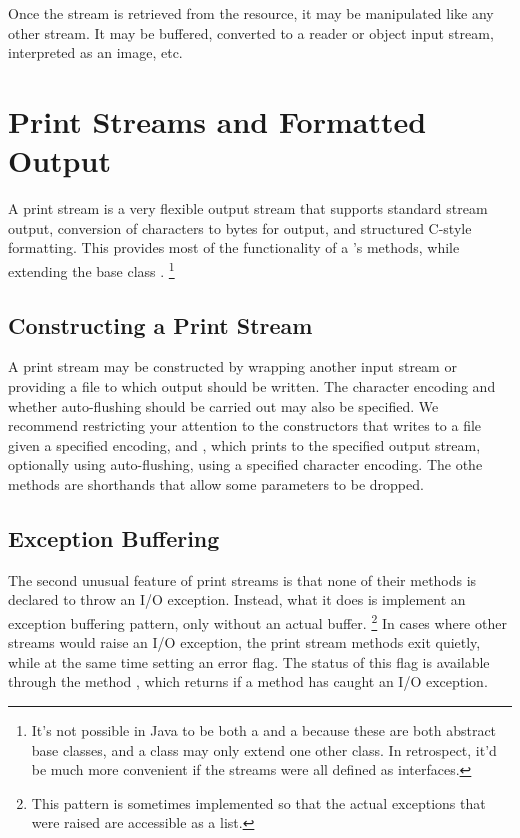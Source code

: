 Once the stream is retrieved from the resource, it may be
manipulated like any other stream.  It may be buffered,
converted to a reader or object input stream, interpreted as
an image, etc.



\section{Print Streams and Formatted Output}\label{section:io-printstream-format}

A print stream is a very flexible output stream that supports standard
stream output, conversion of characters to bytes for output, and
structured C-style formatting.  This provides most of the
functionality of a 's methods, while extending the base
class .%
%
\footnote{It's not possible in Java to be both a  and a
   because these are both abstract base classes, and
  a class may only extend one other class.  In retrospect, it'd be
  much more convenient if the streams were all defined as interfaces.}

\subsection{Constructing a Print Stream}

A print stream may be constructed by wrapping another input stream or
providing a file to which output should be written.  The character
encoding and whether auto-flushing should be carried out may also be
specified.  We recommend restricting your attention to the
constructors  that writes to a file
given a specified encoding, and
, which prints to the
specified output stream, optionally using auto-flushing, using a
specified character encoding.  The othe methods are shorthands that
allow some parameters to be dropped.

\subsection{Exception Buffering}

The second unusual feature of print streams is that none of their
methods is declared to throw an I/O exception.  Instead, what it does
is implement an exception buffering pattern, only without an actual
buffer.%
%
\footnote{This pattern is sometimes implemented so
that the actual exceptions that were raised are accessible as a list.}
%
In cases where other streams would raise an I/O exception, the print
stream methods exit quietly, while at the same time setting an error
flag.  The status of this flag is available through the method
, which returns  if a method has caught
an I/O exception.

